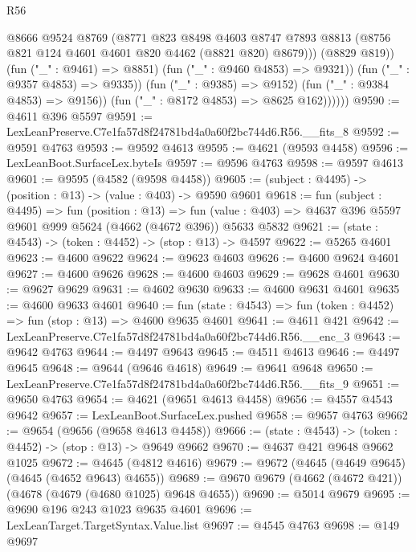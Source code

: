 \begin{lexlean}{R56}
\begin{coremodule}
                        @8666
                        @9524
                        @8769
                        (@8771
                          @823
                          @8498
                          @4603
                          @8747
                          @7893
                          @8813
                          (@8756 @821 @124 @4601 @4601 @820 @4462 (@8821 @820) @8679)))
                      (@8829 @819))
                    (fun ("_" : @9461) => @8851)
                    (fun ("_" : @9460 @4853) => @9321))
                  (fun ("_" : @9357 @4853) => @9335))
                (fun ("_" : @9385) => @9152)
                (fun ("_" : @9384 @4853) => @9156))
              (fun ("_" : @8172 @4853) => @8625 @162))))))
@9590 := @4611 @396 @5597
@9591 := LexLeanPreserve.C7e1fa57d8f24781bd4a0a60f2bc744d6.R56.__fits_8
@9592 := @9591 @4763
@9593 := @9592 @4613
@9595 := @4621 (@9593 @4458)
@9596 := LexLeanBoot.SurfaceLex.byteIs
@9597 := @9596 @4763
@9598 := @9597 @4613
@9601 := @9595 (@4582 (@9598 @4458))
@9605 := (subject : @4495) -> (position : @13) -> (value : @403) -> @9590 @9601
@9618 := fun (subject : @4495) =>
  fun (position : @13) =>
  fun (value : @403) => @4637 @396 @5597 @9601 @999 @5624 (@4662 (@4672 @396)) @5633 @5832
@9621 := (state : @4543) -> (token : @4452) -> (stop : @13) -> @4597
@9622 := @5265 @4601
@9623 := @4600 @9622
@9624 := @9623 @4603
@9626 := @4600 @9624 @4601
@9627 := @4600 @9626
@9628 := @4600 @4603
@9629 := @9628 @4601
@9630 := @9627 @9629
@9631 := @4602 @9630
@9633 := @4600 @9631 @4601
@9635 := @4600 @9633 @4601
@9640 := fun (state : @4543) => fun (token : @4452) => fun (stop : @13) => @4600 @9635 @4601
@9641 := @4611 @421
@9642 := LexLeanPreserve.C7e1fa57d8f24781bd4a0a60f2bc744d6.R56.__enc_3
@9643 := @9642 @4763
@9644 := @4497 @9643
@9645 := @4511 @4613
@9646 := @4497 @9645
@9648 := @9644 (@9646 @4618)
@9649 := @9641 @9648
@9650 := LexLeanPreserve.C7e1fa57d8f24781bd4a0a60f2bc744d6.R56.__fits_9
@9651 := @9650 @4763
@9654 := @4621 (@9651 @4613 @4458)
@9656 := @4557 @4543 @9642
@9657 := LexLeanBoot.SurfaceLex.pushed
@9658 := @9657 @4763
@9662 := @9654 (@9656 (@9658 @4613 @4458))
@9666 := (state : @4543) -> (token : @4452) -> (stop : @13) -> @9649 @9662
@9670 := @4637 @421 @9648 @9662 @1025
@9672 := @4645 (@4812 @4616)
@9679 := @9672 (@4645 (@4649 @9645) (@4645 (@4652 @9643) @4655))
@9689 := @9670 @9679 (@4662 (@4672 @421)) (@4678 (@4679 (@4680 @1025) @9648 @4655))
@9690 := @5014 @9679
@9695 := @9690 @196 @243 @1023 @9635 @4601
@9696 := LexLeanTarget.TargetSyntax.Value.list
@9697 := @4545 @4763
@9698 := @149 @9697

\end{coremodule}
\end{lexlean}
